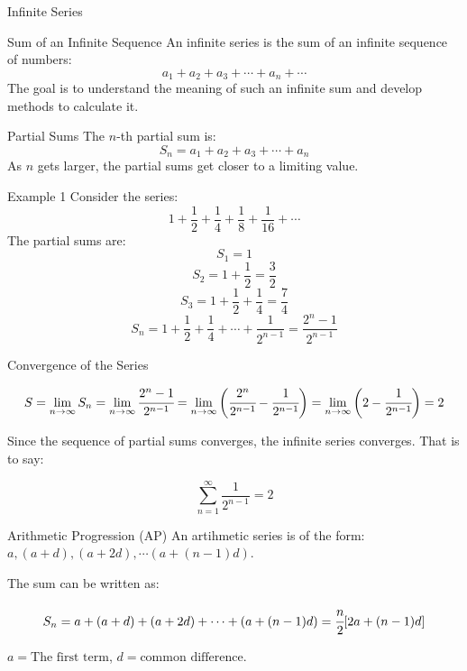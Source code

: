 \documentclass[aspectratio=169,xcolor=dvipsnames,svgnames,x11names,fleqn]{beamer}
\begin{document}
\begin{frame}{}
    \begin{center}
    \Huge \bf \color{DarkBlue}
    \faFire
    
    Infinite Series
\end{center}
\end{frame}


\begin{frame}{Sum of an Infinite Sequence}
An infinite series is the sum of an infinite sequence of numbers:
$$a_1 + a_2 + a_3 + \cdots + a_n + \cdots$$
The goal is to understand the meaning of such an infinite sum and develop methods to calculate it.
\end{frame}

\begin{frame}{Partial Sums}
The $n$-th partial sum is:
$$S_n = a_1 + a_2 + a_3 + \cdots + a_n$$
As $n$ gets larger, the partial sums get closer to a limiting value.
\end{frame}

\begin{frame}{Example 1}
Consider the series:
$$1 + \frac{1}{2} + \frac{1}{4} + \frac{1}{8} + \frac{1}{16} + \cdots$$
The partial sums are:
$$S_1 = 1$$
$$S_2 = 1 + \frac{1}{2} = \frac{3}{2}$$
$$S_3 = 1 + \frac{1}{2} + \frac{1}{4} = \frac{7}{4}$$
$$S_n = 1 + \frac{1}{2} + \frac{1}{4} + \cdots + \frac{1}{2^{n-1}} =  \frac{2^n - 1}{2^{n-1}}$$
\end{frame}

\begin{frame}{Convergence of the Series}

$$
S = \lim_{n \to \infty} S_n = \lim_{n\to \infty} \cfrac{2^n - 1}{2^{n-1}} =   \lim_{n \to \infty} \bigg (  \cfrac{2^n}{2^{n-1}} - \cfrac{1}{2^{n-1}}\bigg) =  \lim_{n \to \infty} \bigg( 2 - \cfrac{1}{2^{n-1}}\bigg) = 2
$$

Since the sequence of partial sums converges, the infinite series converges. That is to say:

$$\sum_{n=1}^{\infty} \frac{1}{2^{n-1}} = 2$$
\end{frame}

\begin{frame}{Arithmetic Progression (AP)}
An artihmetic series is of the form: $a, (a+d), (a+2d), \cdots (a+(n-1)d)$.

The sum can be written as:

$$
S_n = a + (a+d)  + (a+2d) + \cdots +(a + (n-1)d) = \cfrac{n}{2}[2a + (n-1)d]
$$

$
a = \text{The first term}
$, $ d = \text{common difference}$.
\end{frame}
\end{document}
